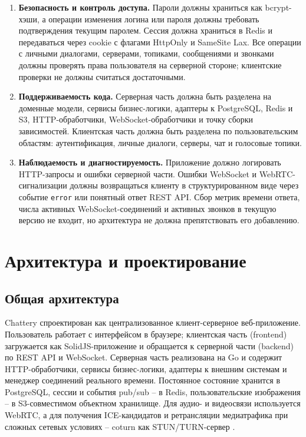 \documentclass[a4paper,12pt]{extarticle}
\begin{document}
\begin{enumerate}
    \item [NF-6] \textbf{Безопасность и контроль доступа.} Пароли должны храниться как bcrypt-хэши, а операции изменения логина или пароля должны требовать подтверждения текущим паролем. Сессия должна храниться в Redis и передаваться через cookie с флагами HttpOnly и SameSite Lax. Все операции с личными диалогами, серверами, топиками, сообщениями и звонками должны проверять права пользователя на серверной стороне; клиентские проверки не должны считаться достаточными.

    \item [NF-7] \textbf{Поддерживаемость кода.} Серверная часть должна быть разделена на доменные модели, сервисы бизнес-логики, адаптеры к PostgreSQL, Redis и S3, HTTP-обработчики, WebSocket-обработчики и точку сборки зависимостей. Клиентская часть должна быть разделена по пользовательским областям: аутентификация, личные диалоги, серверы, чат и голосовые топики.

    \item [NF-8] \textbf{Наблюдаемость и диагностируемость.} Приложение должно логировать HTTP-запросы и ошибки серверной части. Ошибки WebSocket и WebRTC-сигнализации должны возвращаться клиенту в структурированном виде через событие \texttt{error} или понятный ответ REST API. Сбор метрик времени ответа, числа активных WebSocket-соединений и активных звонков в текущую версию не входит, но архитектура не должна препятствовать его добавлению.
\end{enumerate}

\section{Архитектура и проектирование}

\subsection{Общая архитектура}

Chattery спроектирован как централизованное клиент-серверное веб-приложение. Пользователь работает с интерфейсом в браузере; клиентская часть (frontend) загружается как SolidJS-приложение и обращается к серверной части (backend) по REST API и WebSocket. Серверная часть реализована на Go и содержит HTTP-обработчики, сервисы бизнес-логики, адаптеры к внешним системам и менеджер соединений реального времени. Постоянное состояние хранится в PostgreSQL, сессии и события pub/sub -- в Redis, пользовательские изображения -- в S3-совместимом объектном хранилище. Для аудио- и видеосвязи используется WebRTC, а для получения ICE-кандидатов и ретрансляции медиатрафика при сложных сетевых условиях -- coturn как STUN/TURN-сервер \cite{coturn}.
\end{document}
